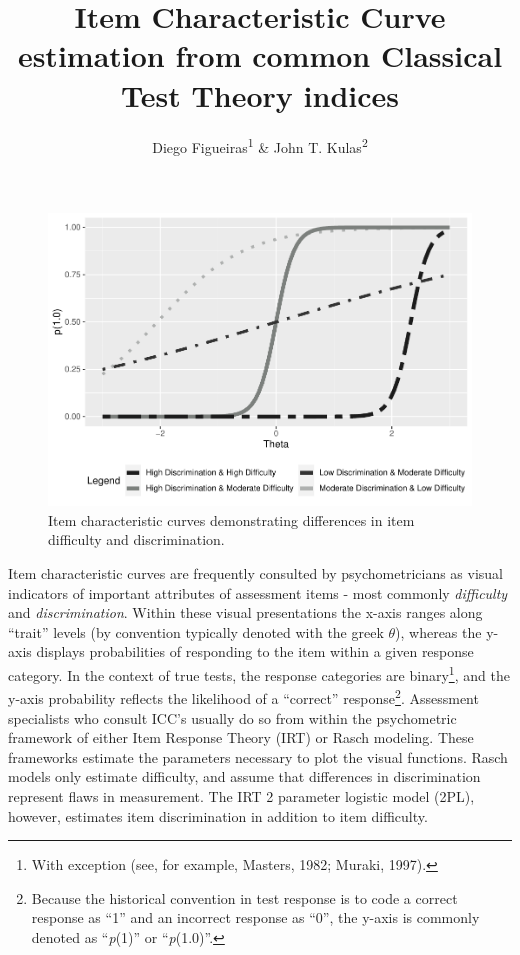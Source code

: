 \documentclass[
  man]{apa6}
\title{Item Characteristic Curve estimation from common Classical Test Theory indices}
\author{Diego Figueiras\textsuperscript{1} \& John T. Kulas\textsuperscript{2}}
\date{}
\affiliation{\vspace{0.5cm}\textsuperscript{1} Montclair State University\\\textsuperscript{2} eRg}
\begin{document}
\maketitle

\begin{figure}
\includegraphics[width=1\linewidth,height=0.8\textheight]{ICC_project_files/figure-latex/example-1} \caption{Item characteristic curves demonstrating differences in item difficulty and discrimination.}\label{fig:example}
\end{figure}

Item characteristic curves are frequently consulted by psychometricians as visual indicators of important attributes of assessment items - most commonly \emph{difficulty} and \emph{discrimination}. Within these visual presentations the x-axis ranges along ``trait'' levels (by convention typically denoted with the greek \(\theta\)), whereas the y-axis displays probabilities of responding to the item within a given response category. In the context of true tests, the response categories are binary\footnote{With exception (see, for example, Masters, 1982; Muraki, 1997).}, and the y-axis probability reflects the likelihood of a ``correct'' response\footnote{Because the historical convention in test response is to code a correct response as ``1'' and an incorrect response as ``0'', the y-axis is commonly denoted as ``\emph{p}(1)'' or ``\emph{p}(1.0)''.}. Assessment specialists who consult ICC's usually do so from within the psychometric framework of either Item Response Theory (IRT) or Rasch modeling. These frameworks estimate the parameters necessary to plot the visual functions. Rasch models only estimate difficulty, and assume that differences in discrimination represent flaws in measurement. The IRT 2 parameter logistic model (2PL), however, estimates item discrimination in addition to item difficulty.
\end{document}
